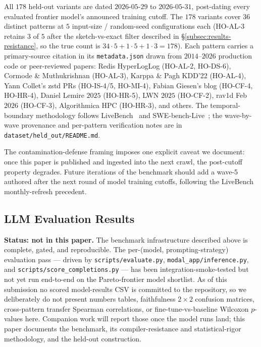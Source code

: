 All $178$ held-out variants are dated $2026$-$05$-$29$ to $2026$-$05$-$31$, post-dating every evaluated frontier model's announced training cutoff. The $178$ variants cover $36$ distinct patterns at $5$ input-size / random-seed configurations each (HO-AL-3 retains $3$ of $5$ after the sketch-vs-exact filter described in \S\ref{subsec:results-resistance}, so the true count is $34 \cdot 5 + 1 \cdot 5 + 1 \cdot 3 = 178$). Each pattern carries a primary-source citation in its \texttt{metadata.json} drawn from $2014$--$2026$ production code or peer-reviewed papers: Redis HyperLogLog (HO-AL-2, HO-DS-6), Cormode \& Muthukrishnan (HO-AL-3), Karppa \& Pagh KDD'22 (HO-AL-4), Yann Collet's zstd PRs (HO-IS-4/5, HO-MI-4), Fabian Giesen's blog (HO-CF-4, HO-HR-4), Daniel Lemire $2025$ (HO-HR-5), LWN $2025$ (HO-CF-2), rav1d Feb~$2026$ (HO-CF-3), Algorithmica HPC (HO-HR-3), and others. The temporal-boundary methodology follows LiveBench~\cite{livebench2024} and SWE-bench-Live~\cite{swebenchlive2025}; the wave-by-wave provenance and per-pattern verification notes are in \texttt{dataset/held\_out/README.md}.

The contamination-defense framing imposes one explicit caveat we document: once this paper is published and ingested into the next crawl, the post-cutoff property degrades. Future iterations of the benchmark should add a wave-5 authored after the next round of model training cutoffs, following the LiveBench monthly-refresh precedent.

\subsection{LLM Evaluation Results}\label{sec:llm-results}

\textbf{Status: not in this paper.} The benchmark infrastructure described above is complete, gated, and reproducible. The per-(model, prompting-strategy) evaluation pass --- driven by \texttt{scripts/evaluate.py}, \texttt{modal\_app/inference.py}, and \texttt{scripts/score\_completions.py} --- has been integration-smoke-tested but not yet run end-to-end on the Pareto-frontier model shortlist. As of this submission no scored model-results CSV is committed to the repository, so we deliberately do not present numbers tables, faithfulness $2\times2$ confusion matrices, cross-pattern transfer Spearman correlations, or fine-tune-vs-baseline Wilcoxon $p$-values here. Companion work will report those once the model runs land; this paper documents the benchmark, its compiler-resistance and statistical-rigor methodology, and the held-out construction.
